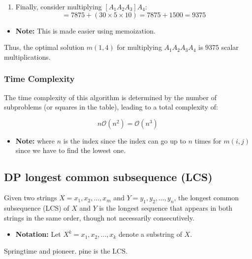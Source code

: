 \begin{example}
\begin{itemize}
\begin{enumerate}
            \item Finally, consider multiplying \([A_1 A_2 A_3] A_4\):
            \[
            = 7875 + (30 \times 5 \times 10) = 7875 + 1500 = 9375
            \]
        \end{enumerate}
        \begin{itemize}
            \item \textbf{Note:} This is made easier using memoization.
        \end{itemize}
        Thus, the optimal solution $m(1,4)$ for multiplying \(A_1 A_2 A_3 A_4\) is \(9375\) scalar multiplications.
    \end{itemize}
    \vspace{1em}
\end{example}

\subsubsection{Time Complexity}
\begin{definition}
    The time complexity of this algorithm is determined by the number of subproblems (or squares in the table), leading to a total complexity of:

    \[
    n \mathcal{O}(n^2) = \mathcal{O}(n^3)
    \]
    \begin{itemize}
        \item \textbf{Note:} where \(n\) is the index since the index can go up to $n$ times for $m(i,j)$ since we have to find the lowest one. 
    \end{itemize}
\end{definition}

\subsection{DP longest common subsequence (LCS)}
\begin{definition}
Given two strings \(X = x_1, x_2, \dots, x_m\) and \(Y = y_1, y_2, \dots, y_n\), the longest common subsequence (LCS) of \(X\) and \(Y\) is the longest sequence that appears in both strings in the same order, though not necessarily consecutively.
\begin{itemize}
    \item \textbf{Notation:} Let \(X^k = x_1, x_2, \dots, x_k\) denote a substring of \(X\).
\end{itemize}
\end{definition}

\begin{example}
    Springtime and pioneer. pine is the LCS.
\end{example}

